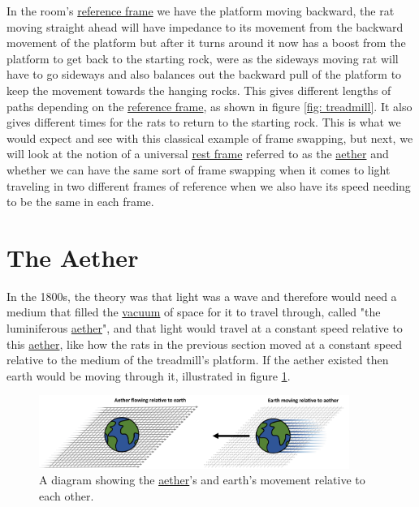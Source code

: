 In the room's \hyperlink{def-Reference-frame}{reference frame} we have the platform moving backward, the rat moving straight ahead will have impedance to its movement from the backward movement of the platform but after it turns around it now has a boost from the platform to get back to the starting rock, were as the sideways moving rat will have to go sideways and also balances out the backward pull of the platform to keep the movement towards the hanging rocks. This gives different lengths of paths depending on the \hyperlink{def-Reference-frame}{reference frame}, as shown in figure \ref{fig: treadmill}. It also gives different times for the rats to return to the starting rock. This is what we would expect and see with this classical example of frame swapping, but next, we will look at the notion of a universal \hyperlink{def-proper-frame}{rest frame} referred to as the \hyperlink{def-aether}{aether} and whether we can have the same sort of frame swapping when it comes to light traveling in two different frames of reference when we also have its speed needing to be the same in each frame.

\section{The Aether}%

In the 1800s, the theory was that light was a wave and therefore would need a medium that filled the \hyperlink{def-vacuum}{vacuum} of space for it to travel through, called "the luminiferous \hyperlink{def-aether}{aether}", and that light would travel at a constant speed relative to this \hyperlink{def-aether}{aether}, like how the rats in the previous section moved at a constant speed relative to the medium of the treadmill's platform. If the aether existed then earth would be moving through it, illustrated in figure \ref{fig: Aether}.

\begin{figure}[ht]
	\centering
	\includegraphics[width=0.9\textwidth]{images/pdf/earth_and_aether.pdf}
	\caption{A diagram showing the \protect\hyperlink{def-aether}{aether}'s and earth's movement relative to each other.}
	\label{fig: Aether}
\end{figure}

